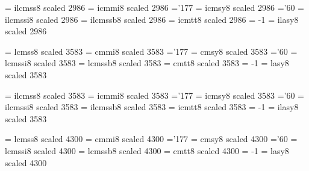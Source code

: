 \font\itwentyfourrm   = ilcmss8  scaled 2986 %
\font\itwentyfouri    = icmmi8   scaled 2986 %
    \skewchar\itwentyfouri ='177                  %
\font\itwentyfoursy   = icmsy8   scaled 2986 %
    \skewchar\itwentyfoursy ='60           %
\font\itwentyfourit   = ilcmssi8 scaled 2986 %
\font\itwentyfourbf   = ilcmssb8 scaled 2986 %
\font\itwentyfourtt   = icmtt8   scaled 2986 %
    \hyphenchar\itwentyfourtt = -1         %
\font\itwentyfourlasy = ilasy8  scaled 2986 %

\font\twentyninerm   = lcmss8  scaled 3583 %
\font\twentyninei    = cmmi8   scaled 3583 %
    \skewchar\twentyninei ='177                  %
\font\twentyninesy   = cmsy8   scaled 3583 %
    \skewchar\twentyninesy ='60           %
\font\twentynineit   = lcmssi8 scaled 3583 %
\font\twentyninebf   = lcmssb8 scaled 3583 %
\font\twentyninett   = cmtt8   scaled 3583 %
    \hyphenchar\twentyninett = -1         %
\font\twentyninelasy = lasy8  scaled 3583 %

\font\itwentyninerm   = ilcmss8  scaled 3583 %
\font\itwentyninei    = icmmi8   scaled 3583 %
    \skewchar\itwentyninei ='177                  %
\font\itwentyninesy   = icmsy8   scaled 3583 %
    \skewchar\itwentyninesy ='60           %
\font\itwentynineit   = ilcmssi8 scaled 3583 %
\font\itwentyninebf   = ilcmssb8 scaled 3583 %
\font\itwentyninett   = icmtt8   scaled 3583 %
    \hyphenchar\itwentyninett = -1         %
\font\itwentyninelasy = ilasy8  scaled 3583 %

\font\thirtyfourrm   = lcmss8  scaled 4300 %
\font\thirtyfouri    = cmmi8   scaled 4300 %
    \skewchar\thirtyfouri ='177                  %
\font\thirtyfoursy   = cmsy8   scaled 4300 %
    \skewchar\thirtyfoursy ='60           %
\font\thirtyfourit   = lcmssi8 scaled 4300 %
\font\thirtyfourbf   = lcmssb8 scaled 4300 %
\font\thirtyfourtt   = cmtt8   scaled 4300 %
    \hyphenchar\thirtyfourtt = -1         %
\font\thirtyfourlasy = lasy8  scaled 4300 %


